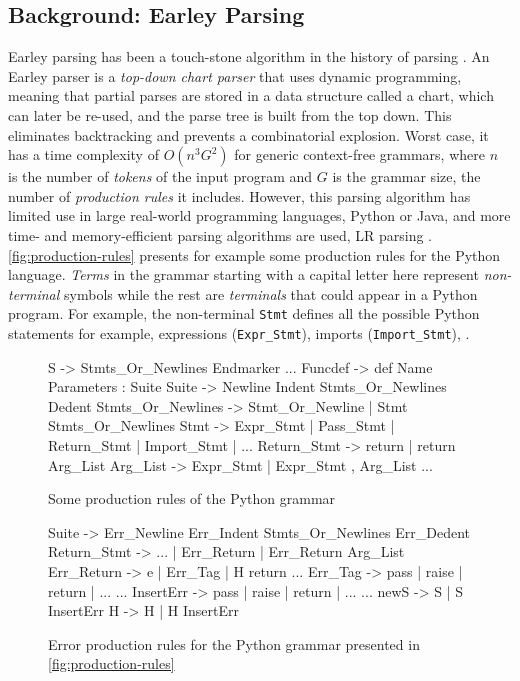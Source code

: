 \subsection{Background: Earley Parsing}
\label{sec:overview:earleyparsing}

 Earley parsing has been a touch-stone algorithm in the
history of parsing \citep{Earley_1970}. An Earley parser is a \emph{top-down
chart parser} that uses dynamic programming, meaning that partial parses are
stored in a data structure called a chart, which can later be re-used, and the
parse tree is built from the top down. This eliminates backtracking and prevents
a combinatorial explosion. Worst case, it has a time complexity of $O(n^3 G^2)$
for generic context-free grammars, where $n$ is the number of \emph{tokens} of
the input program and $G$ is the grammar size, \ie the number of
\emph{production rules} it includes. However, this parsing algorithm has limited
use in large real-world programming languages, \eg Python or Java, and more
time- and memory-efficient parsing algorithms are used, \eg LR parsing \etc
\citep{Knuth_1965, Chapman_1987}. \autoref{fig:production-rules} presents for
example some production rules for the Python language. \emph{Terms} in the
grammar starting with a capital letter here represent \emph{non-terminal}
symbols while the rest are \emph{terminals} that could appear in a Python
program. For example, the non-terminal \texttt{Stmt} defines all the possible
Python statements for example, \ie expressions (\texttt{Expr\_Stmt}), imports
(\texttt{Import\_Stmt}), \etc.

\begin{figure}[ht]
\begin{ecode}
S -> Stmts_Or_Newlines Endmarker
...
Funcdef -> def Name Parameters : Suite
Suite -> Newline Indent Stmts_Or_Newlines Dedent
Stmts_Or_Newlines -> Stmt_Or_Newline | Stmt Stmts_Or_Newlines
Stmt -> Expr_Stmt | Pass_Stmt | Return_Stmt | Import_Stmt | ...
Return_Stmt -> return | return Arg_List
Arg_List -> Expr_Stmt | Expr_Stmt , Arg_List
...
\end{ecode}
\caption{Some production rules of the Python grammar}
\label{fig:production-rules}
\end{figure}

\begin{figure}[ht]
\begin{ecode}
Suite -> Err_Newline Err_Indent Stmts_Or_Newlines Err_Dedent
Return_Stmt -> ... | Err_Return | Err_Return Arg_List
Err_Return -> e | Err_Tag | H return
...
Err_Tag -> pass | raise | return | ...
...
InsertErr -> pass | raise | return | ...
...
newS -> S | S InsertErr
H -> H | H InsertErr
\end{ecode}
\caption{Error production rules for the Python grammar presented in
\autoref{fig:production-rules}}
\label{fig:error-rules}
\end{figure}

